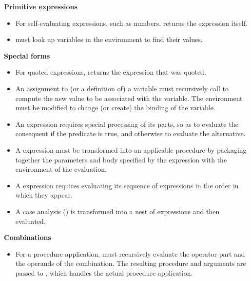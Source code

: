 \bigskip
{}%
\noindent
\textbf{Primitive expressions}

\begin{itemize}
\item
For self-evaluating expressions, such as numbers,  returns the
expression itself.

\item
{} must look up variables in the environment to find their values.
\end{itemize}

%
\noindent
\textbf{Special forms}

\begin{itemize}
\item
For quoted expressions,  returns the expression that was quoted.

\item
An assignment to (or a definition of) a variable must recursively call
 to compute the new value to be associated with the variable.  The
environment must be modified to change (or create) the binding of the variable.

\item
An  expression requires special processing of its parts, so as to
evaluate the consequent if the predicate is true, and otherwise to evaluate the
alternative.

\item
A  expression must be transformed into an applicable procedure by
packaging together the parameters and body specified by the 
expression with the environment of the evaluation.

\item
A  expression requires evaluating its sequence of expressions in
the order in which they appear.

\item
A case analysis () is transformed into a nest of 
expressions and then evaluated.
\end{itemize}

%
\noindent
\textbf{Combinations}

\begin{itemize}
\item
For a procedure application,  must recursively evaluate the operator
part and the operands of the combination.  The resulting procedure and
arguments are passed to , which handles the actual procedure
application.
\end{itemize}

